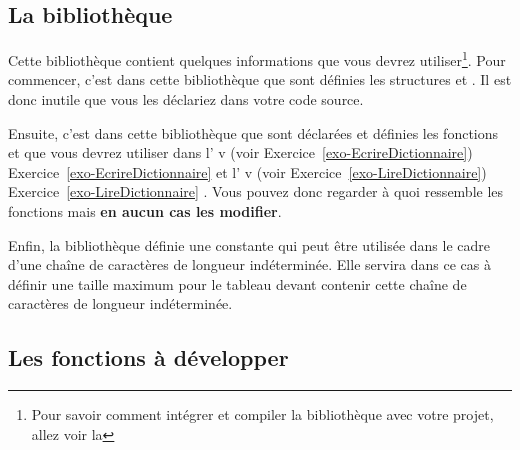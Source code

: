 \documentclass[a4paper]{article}
\makeatletter
\newcommand{\ExoRef}[2][]{\def\@Un{#1}\def\@Deux{#2}\def\@Voir{v}%
		\ifx\@Un\@Voir%
		(voir Exercice~\vref{#2})%
		\else%
		Exercice~\vref{#2}%
		\fi}
\makeatother
\begin{document}
		\subsection{La bibliothèque }
			Cette bibliothèque contient quelques informations que vous devrez utiliser\footnote{Pour savoir comment intégrer et compiler la bibliothèque avec votre projet, allez voir la }.
			Pour commencer, c'est dans cette bibliothèque que sont définies les structures  et .
			Il est donc inutile que vous les déclariez dans votre code source.

			Ensuite, c'est dans cette bibliothèque que sont déclarées et définies les fonctions  et  que vous devrez utiliser dans l'\ExoRef{exo-EcrireDictionnaire} et l'\ExoRef{exo-LireDictionnaire}.
			Vous pouvez donc regarder à quoi ressemble les fonctions mais \textbf{en aucun cas les modifier}.

			Enfin, la bibliothèque définie une constante   qui peut être utilisée dans le cadre d'une chaîne de caractères de longueur indéterminée.
			Elle servira dans ce cas à définir une taille maximum pour le tableau devant contenir cette chaîne de caractères de longueur indéterminée.

		\subsection{Les fonctions à développer}
\end{document}
